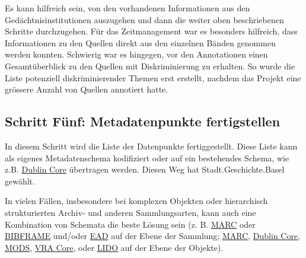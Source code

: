 \documentclass[
  nswissgerman,
  letterpaper,
  DIV=11,
  numbers=noendperiod]{scrartcl}
\begin{document}
\begin{tcolorbox}[enhanced jigsaw, arc=.35mm, bottomrule=.15mm, bottomtitle=1mm, breakable, colback=white, colbacktitle=quarto-callout-tip-color!10!white, colframe=quarto-callout-tip-color-frame, coltitle=black, left=2mm, leftrule=.75mm, opacityback=0, opacitybacktitle=0.6, rightrule=.15mm, title=\textcolor{quarto-callout-tip-color}{\faLightbulb}\hspace{0.5em}{Erfahrungen der Stadt.Geschichte.Basel}, titlerule=0mm, toprule=.15mm, toptitle=1mm]

Es kann hilfreich sein, von den vorhandenen Informationen aus den
Gedächtnisinstitutionen auszugehen und dann die weiter oben
beschriebenen Schritte durchzugehen. Für das Zeitmanagement war es
besonders hilfreich, dass Informationen zu den Quellen direkt aus den
einzelnen Bänden genommen werden konnten. Schwierig war es hingegen, vor
den Annotationen einen Gesamtüberblick zu den Quellen mit
Diskriminierung zu erhalten. So wurde die Liste potenziell
diskriminierender Themen erst erstellt, nachdem das Projekt eine
grössere Anzahl von Quellen annotiert hatte.

\end{tcolorbox}

\subsection{Schritt Fünf: Metadatenpunkte
fertigstellen}\label{schritt-fuxfcnf-metadatenpunkte-fertigstellen}

In diesem Schritt wird die Liste der Datenpunkte fertiggestellt. Diese
Liste kann als eigenes Metadatenschema kodifiziert oder auf ein
bestehendes Schema, wie z.B. \href{https://www.dublincore.org}{Dublin
Core} übertragen werden. Diesen Weg hat Stadt.Geschichte.Basel gewählt.

In vielen Fällen, insbesondere bei komplexen Objekten oder hierarchisch
strukturierten Archiv- und anderen Sammlungsarten, kann auch eine
Kombination von Schemata die beste Lösung sein (z. B.
\href{https://www.loc.gov/marc/}{MARC} oder
\href{https://www.loc.gov/bibframe/}{BIBFRAME} und/oder
\href{https://www.loc.gov/ead/}{EAD} auf der Ebene der Sammlung;
\href{https://www.loc.gov/marc/}{MARC},
\href{https://dublincore.org/}{Dublin Core},
\href{https://www.loc.gov/standards/mods/}{MODS},
\href{http://core.vraweb.org/}{VRA Core}, oder
\href{https://cidoc.mini.icom.museum/working-groups/lido/lido-overview/about-lido/what-is-lido/}{LIDO}
auf der Ebene der Objekte).
\end{document}
